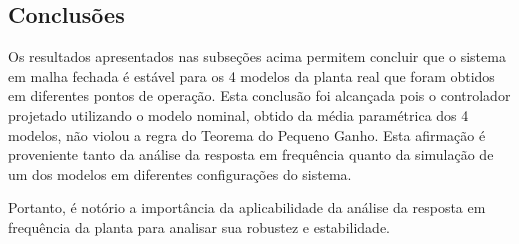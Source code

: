 \subsection{Conclusões}
Os resultados apresentados nas subseções acima permitem concluir que o sistema
em malha fechada é estável para os 4 modelos da planta real que foram obtidos em
diferentes pontos de operação. Esta conclusão foi alcançada pois o controlador
projetado utilizando o modelo nominal, obtido da média paramétrica dos 4
modelos, não violou a regra do Teorema do Pequeno Ganho. Esta afirmação é
proveniente tanto da análise da resposta em frequência quanto da simulação de um
dos modelos em diferentes configurações do sistema.

Portanto, é notório a importância da aplicabilidade da análise da resposta em
frequência da planta para analisar sua robustez e estabilidade.
